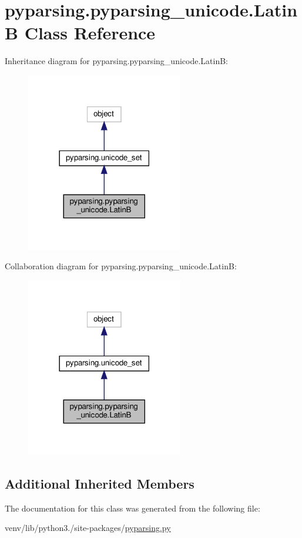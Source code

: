 \hypertarget{classpyparsing_1_1pyparsing__unicode_1_1LatinB}{}\section{pyparsing.\+pyparsing\+\_\+unicode.\+LatinB Class Reference}
\label{classpyparsing_1_1pyparsing__unicode_1_1LatinB}


Inheritance diagram for pyparsing.\+pyparsing\+\_\+unicode.\+LatinB\+:
\nopagebreak
\begin{figure}[H]
\begin{center}
\leavevmode
\includegraphics[width=194pt]{classpyparsing_1_1pyparsing__unicode_1_1LatinB__inherit__graph}
\end{center}
\end{figure}


Collaboration diagram for pyparsing.\+pyparsing\+\_\+unicode.\+LatinB\+:
\nopagebreak
\begin{figure}[H]
\begin{center}
\leavevmode
\includegraphics[width=194pt]{classpyparsing_1_1pyparsing__unicode_1_1LatinB__coll__graph}
\end{center}
\end{figure}
\subsection*{Additional Inherited Members}


The documentation for this class was generated from the following file\+:\begin{DoxyCompactItemize}
\item 
venv/lib/python3./site-\/packages/\hyperlink{pyparsing_8py}{pyparsing.\+py}\end{DoxyCompactItemize}
